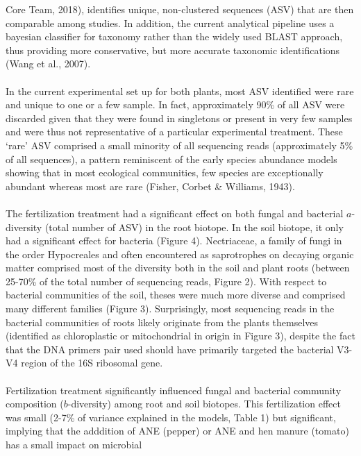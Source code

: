 \documentclass[12pt,]{article}
\begin{document}
Core Team, 2018), identifies unique, non-clustered sequences (ASV) that
are then comparable among studies. In addition, the current analytical
pipeline uses a bayesian classifier for taxonomy rather than the widely
used BLAST approach, thus providing more conservative, but more accurate
taxonomic identifications (Wang et al., 2007).\\
\hspace*{0.333em}\\
In the current experimental set up for both plants, most ASV identified
were rare and unique to one or a few sample. In fact, approximately 90\%
of all ASV were discarded given that they were found in singletons or
present in very few samples and were thus not representative of a
particular experimental treatment. These `rare' ASV comprised a small
minority of all sequencing reads (approximately 5\% of all sequences), a
pattern reminiscent of the early species abundance models showing that
in most ecological communities, few species are exceptionally abundant
whereas most are rare (Fisher, Corbet \& Williams, 1943).\\
\hspace*{0.333em}\\
The fertilization treatment had a significant effect on both fungal and
bacterial \(a\)-diversity (total number of ASV) in the root biotope. In
the soil biotope, it only had a significant effect for bacteria (Figure
4). Nectriaceae, a family of fungi in the order Hypocreales and often
encountered as saprotrophes on decaying organic matter comprised most of
the diversity both in the soil and plant roots (between 25-70\% of the
total number of sequencing reads, Figure 2). With respect to bacterial
communities of the soil, theses were much more diverse and comprised
many different families (Figure 3). Surprisingly, most sequencing reads
in the bacterial communities of roots likely originate from the plants
themselves (identified as chloroplastic or mitochondrial in origin in
Figure 3), despite the fact that the DNA primers pair used should have
primarily targeted the bacterial V3-V4 region of the 16S ribosomal
gene.\\
\hspace*{0.333em}\\
Fertilization treatment significantly influenced fungal and bacterial
community composition (\(b\)-diversity) among root and soil biotopes.
This fertilization effect was small (2-7\% of variance explained in the
models, Table 1) but significant, implying that the adddition of ANE
(pepper) or ANE and hen manure (tomato) has a small impact on microbial
\end{document}
